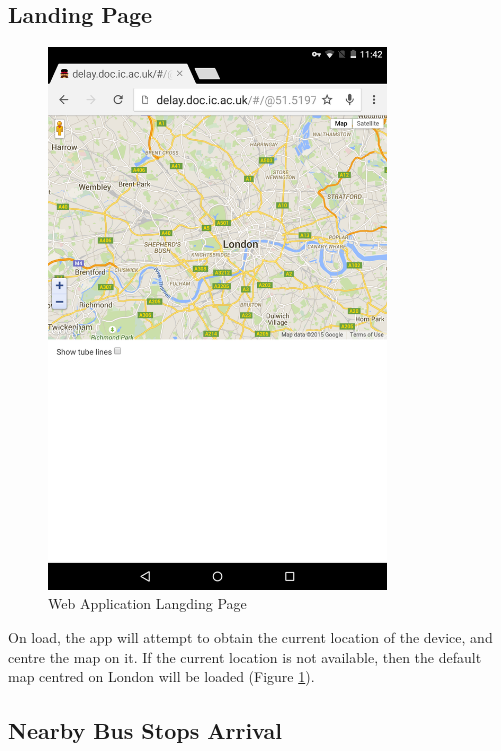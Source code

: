 \subsection{Landing Page}

\begin{figure}
\centering
\includegraphics[width=0.8\textwidth]{figures/landing_page.png}
\caption{\label{fig:landing_page} Web Application Langding Page}
\end{figure}

\par On load, the app will attempt to obtain the current location of the device, and centre the map on it. If the current location is not available, then the default map centred on London will be loaded (Figure \ref{fig:landing_page}).


\subsection{Nearby Bus Stops Arrival}

